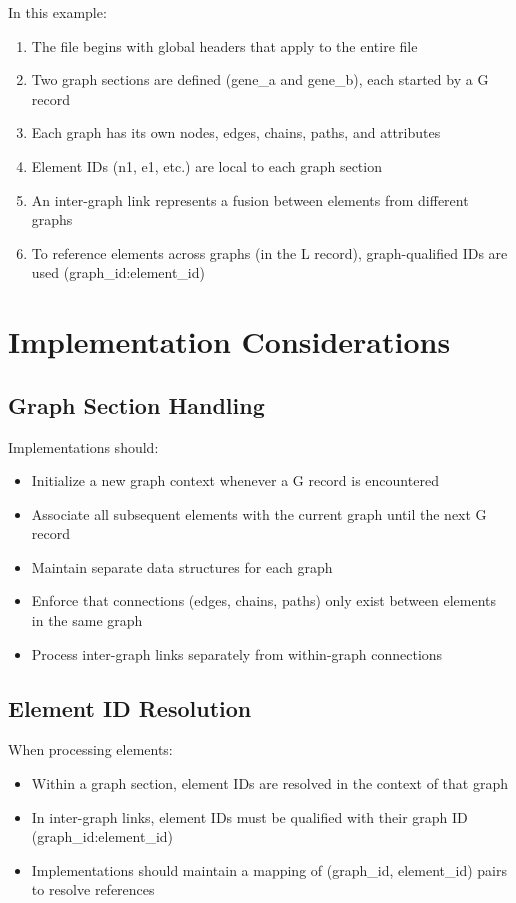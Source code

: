 \documentclass[11pt,a4paper]{article}
\begin{document}
In this example:

\begin{enumerate}[leftmargin=*]
	\item The file begins with global headers that apply to the entire file
	\item Two graph sections are defined (gene\_a and gene\_b), each started by a G record
	\item Each graph has its own nodes, edges, chains, paths, and attributes
	\item Element IDs (n1, e1, etc.) are local to each graph section
	\item An inter-graph link represents a fusion between elements from different graphs
	\item To reference elements across graphs (in the L record), graph-qualified IDs are used (graph\_id:element\_id)
\end{enumerate}

\section{Implementation Considerations}

\subsection{Graph Section Handling}

Implementations should:

\begin{itemize}[leftmargin=*]
	\item Initialize a new graph context whenever a G record is encountered
	\item Associate all subsequent elements with the current graph until the next G record
	\item Maintain separate data structures for each graph
	\item Enforce that connections (edges, chains, paths) only exist between elements in the same graph
	\item Process inter-graph links separately from within-graph connections
\end{itemize}

\subsection{Element ID Resolution}

When processing elements:

\begin{itemize}[leftmargin=*]
	\item Within a graph section, element IDs are resolved in the context of that graph
	\item In inter-graph links, element IDs must be qualified with their graph ID (graph\_id:element\_id)
	\item Implementations should maintain a mapping of (graph\_id, element\_id) pairs to resolve references
\end{itemize}
\end{document}
